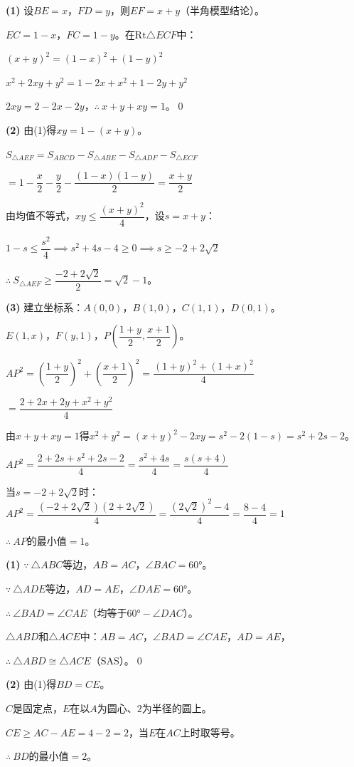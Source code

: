 \documentclass[12pt, a4paper]{ctexart}
\begin{document}
\begin{proofbox}[【题1】详解]
\textbf{(1)} 设$BE = x$，$FD = y$，则$EF = x + y$（半角模型结论）。

$EC = 1 - x$，$FC = 1 - y$。在$\mathrm{Rt}\triangle ECF$中：

$(x+y)^2 = (1-x)^2 + (1-y)^2$

$x^2 + 2xy + y^2 = 1 - 2x + x^2 + 1 - 2y + y^2$

$2xy = 2 - 2x - 2y$，$\therefore\ x + y + xy = 1$。\qed

\textbf{(2)} 由(1)得$xy = 1 - (x+y)$。

$S_{\triangle AEF} = S_{ABCD} - S_{\triangle ABE} - S_{\triangle ADF} - S_{\triangle ECF}$

$= 1 - \dfrac{x}{2} - \dfrac{y}{2} - \dfrac{(1-x)(1-y)}{2} = \dfrac{x+y}{2}$

由均值不等式，$xy \leqslant \dfrac{(x+y)^2}{4}$，设$s = x+y$：

$1 - s \leqslant \dfrac{s^2}{4} \implies s^2 + 4s - 4 \geqslant 0 \implies s \geqslant -2 + 2\sqrt{2}$

$\therefore\ S_{\triangle AEF} \geqslant \dfrac{-2+2\sqrt{2}}{2} = \boxed{\sqrt{2} - 1}$。

\textbf{(3)} 建立坐标系：$A(0,0)$，$B(1,0)$，$C(1,1)$，$D(0,1)$。

$E(1, x)$，$F(y, 1)$，$P\left(\dfrac{1+y}{2}, \dfrac{x+1}{2}\right)$。

$AP^2 = \left(\dfrac{1+y}{2}\right)^2 + \left(\dfrac{x+1}{2}\right)^2 = \dfrac{(1+y)^2 + (1+x)^2}{4}$

$= \dfrac{2 + 2x + 2y + x^2 + y^2}{4}$

由$x + y + xy = 1$得$x^2 + y^2 = (x+y)^2 - 2xy = s^2 - 2(1-s) = s^2 + 2s - 2$。

$AP^2 = \dfrac{2 + 2s + s^2 + 2s - 2}{4} = \dfrac{s^2 + 4s}{4} = \dfrac{s(s+4)}{4}$

当$s = -2 + 2\sqrt{2}$时：$AP^2 = \dfrac{(-2+2\sqrt{2})(2+2\sqrt{2})}{4} = \dfrac{(2\sqrt{2})^2 - 4}{4} = \dfrac{8-4}{4} = 1$

$\therefore\ AP$的最小值$= \boxed{1}$。
\end{proofbox}

\begin{proofbox}[【题2】详解]
\textbf{(1)} $\because\ \triangle ABC$等边，$AB = AC$，$\angle BAC = 60°$。

$\because\ \triangle ADE$等边，$AD = AE$，$\angle DAE = 60°$。

$\therefore\ \angle BAD = \angle CAE$（均等于$60° - \angle DAC$）。

$\triangle ABD$和$\triangle ACE$中：$AB = AC$，$\angle BAD = \angle CAE$，$AD = AE$，

$\therefore\ \triangle ABD \cong \triangle ACE$（SAS）。\qed

\textbf{(2)} 由(1)得$BD = CE$。

$C$是固定点，$E$在以$A$为圆心、$2$为半径的圆上。

$CE \geqslant AC - AE = 4 - 2 = 2$，当$E$在$AC$上时取等号。

$\therefore\ BD$的最小值$= \boxed{2}$。
\end{proofbox}
\end{document}
